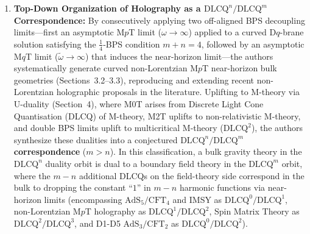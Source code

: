 \documentclass[11pt,a4paper]{article}
\begin{document}
\begin{enumerate}[label=(\alph*),leftmargin=1.8em]
    \item \textbf{Top-Down Organization of Holography as a $\text{DLCQ}^n/\text{DLCQ}^m$ Correspondence:}
    By consecutively applying two off-aligned BPS decoupling limits---first an asymptotic M$p$T limit ($\omega \to \infty$) applied to a curved D$q$-brane solution satisfying the $\tfrac{1}{4}$-BPS condition $m+n=4$, followed by an asymptotic M$q$T limit ($\tilde{\omega} \to \infty$) that induces the near-horizon limit---the authors systematically generate curved non-Lorentzian M$p$T near-horizon bulk geometries (Sections~3.2--3.3), reproducing and extending recent non-Lorentzian holographic proposals in the literature. Uplifting to M-theory via U-duality (Section~4), where M0T arises from Discrete Light Cone Quantisation (DLCQ) of M-theory, M2T uplifts to non-relativistic M-theory, and double BPS limits uplift to multicritical M-theory ($\text{DLCQ}^2$), the authors synthesize these dualities into a conjectured \textbf{$\text{DLCQ}^n/\text{DLCQ}^m$ correspondence} ($m > n$). In this classification, a bulk gravity theory in the $\text{DLCQ}^n$ duality orbit is dual to a boundary field theory in the $\text{DLCQ}^m$ orbit, where the $m-n$ additional DLCQs on the field-theory side correspond in the bulk to dropping the constant ``$1$'' in $m-n$ harmonic functions via near-horizon limits (encompassing $\text{AdS}_5/\text{CFT}_4$ and IMSY as $\text{DLCQ}^0/\text{DLCQ}^1$, non-Lorentzian M$p$T holography as $\text{DLCQ}^1/\text{DLCQ}^2$, Spin Matrix Theory as $\text{DLCQ}^2/\text{DLCQ}^3$, and D1-D5 $\text{AdS}_3/\text{CFT}_2$ as $\text{DLCQ}^0/\text{DLCQ}^2$).


\end{enumerate}
\end{document}
